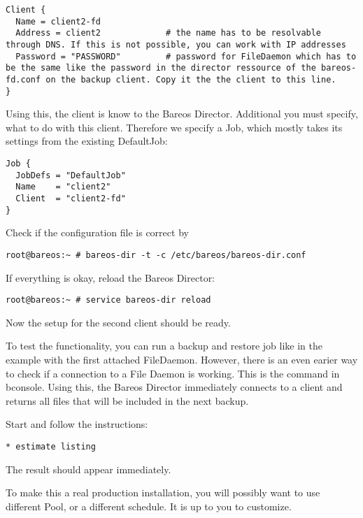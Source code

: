 \footnotesize
\begin{verbatim}
Client {
  Name = client2-fd
  Address = client2             # the name has to be resolvable through DNS. If this is not possible, you can work with IP addresses
  Password = "PASSWORD"         # password for FileDaemon which has to be the same like the password in the director ressource of the bareos-fd.conf on the backup client. Copy it the the client to this line.
}
\end{verbatim}
\normalsize

Using this, the client is know to the Bareos Director. Additional you must specify, what to do with this client.
Therefore we specify a Job, which mostly takes its settings from the existing DefaultJob:

\footnotesize
\begin{verbatim}
Job {
  JobDefs = "DefaultJob"
  Name    = "client2"
  Client  = "client2-fd"
}
\end{verbatim}
\normalsize

Check if the configuration file is correct by
\footnotesize
\begin{verbatim}
root@bareos:~ # bareos-dir -t -c /etc/bareos/bareos-dir.conf
\end{verbatim}
\normalsize

If everything is okay, reload the Bareos Director:
\footnotesize
\begin{verbatim}
root@bareos:~ # service bareos-dir reload
\end{verbatim}
\normalsize

Now the setup for the second client should be ready.

To test the functionality, you can run a backup and restore job like in the example with the first attached FileDaemon.
However, there is an even earier way to check if a connection to a File Daemon is working. This is the  command in bconsole. Using this, the Bareos Director immediately connects to a client and returns all files that will be included in the next backup.

Start  and follow the instructions:
\footnotesize
\begin{verbatim}
* estimate listing
\end{verbatim}
\normalsize

The result should appear immediately.

To make this a real production installation, you will possibly want to use
different Pool, or a different schedule. It is up to you to customize.

